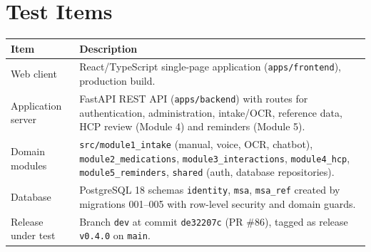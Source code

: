 \documentclass[10pt,letterpaper]{article}
\begin{document}
\section{Test Items}
\begin{longtable}{|L{4.2cm}|L{11.3cm}|}
\hline \textbf{Item} & \textbf{Description}\\ \hline \endhead
Web client & React/TypeScript single-page application (\texttt{apps/frontend}), production build.\\ \hline
Application server & FastAPI REST API (\texttt{apps/backend}) with routes for authentication, administration, intake/OCR, reference data, HCP review (Module 4) and reminders (Module 5).\\ \hline
Domain modules & \texttt{src/module1\_intake} (manual, voice, OCR, chatbot), \texttt{module2\_medications}, \texttt{module3\_interactions}, \texttt{module4\_hcp}, \texttt{module5\_reminders}, \texttt{shared} (auth, database repositories).\\ \hline
Database & PostgreSQL 18 schemas \texttt{identity}, \texttt{msa}, \texttt{msa\_ref} created by migrations 001--005 with row-level security and domain guards.\\ \hline
Release under test & Branch \texttt{dev} at commit \texttt{de32207c} (PR \#86), tagged as release \texttt{v0.4.0} on \texttt{main}.\\ \hline
\end{longtable}

\end{document}
